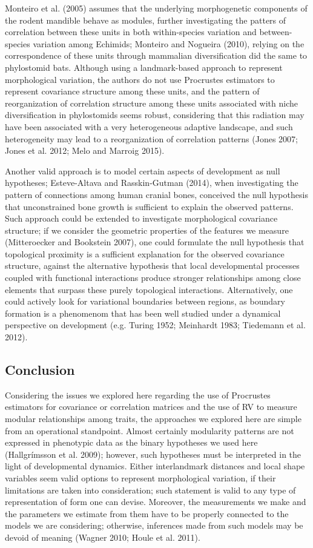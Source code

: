 \documentclass[12pt,]{article}
\begin{document}
Monteiro et al. (2005) assumes that the underlying morphogenetic
components of the rodent mandible behave as modules, further
investigating the patters of correlation between these units in both
within-species variation and between-species variation among Echimids;
Monteiro and Nogueira (2010), relying on the correspondence of these
units through mammalian diversification did the same to phylostomid
bats. Although using a landmark-based approach to represent
morphological variation, the authors do not use Procrustes estimators to
represent covariance structure among these units, and the pattern of
reorganization of correlation structure among these units associated
with niche diversification in phylostomids seems robust, considering
that this radiation may have been associated with a very heterogeneous
adaptive landscape, and such heterogeneity may lead to a reorganization
of correlation patterns (Jones 2007; Jones et al. 2012; Melo and Marroig
2015).

Another valid approach is to model certain aspects of development as
null hypotheses; Esteve-Altava and Rasskin-Gutman (2014), when
investigating the pattern of connections among human cranial bones,
conceived the null hypothesis that unconstrained bone growth is
sufficient to explain the observed patterns. Such approach could be
extended to investigate morphological covariance structure; if we
consider the geometric properties of the features we measure
(Mitteroecker and Bookstein 2007), one could formulate the null
hypothesis that topological proximity is a sufficient explanation for
the observed covariance structure, against the alternative hypothesis
that local developmental processes coupled with functional interactions
produce stronger relationships among close elements that surpass these
purely topological interactions. Alternatively, one could actively look
for variational boundaries between regions, as boundary formation is a
phenomenom that has been well studied under a dynamical perspective on
development (e.g. Turing 1952; Meinhardt 1983; Tiedemann et al. 2012).

\subsection{Conclusion}\label{conclusion}

Considering the issues we explored here regarding the use of Procrustes
estimators for covariance or correlation matrices and the use of RV to
measure modular relationships among traits, the approaches we explored
here are simple from an operational standpoint. Almost certainly
modularity patterns are not expressed in phenotypic data as the binary
hypotheses we used here (Hallgrímsson et al. 2009); however, such
hypotheses must be interpreted in the light of developmental dynamics.
Either interlandmark distances and local shape variables seem valid
options to represent morphological variation, if their limitations are
taken into consideration; such statement is valid to any type of
representation of form one can devise. Moreover, the measurements we
make and the parameters we estimate from them have to be properly
connected to the models we are considering; otherwise, inferences made
from such models may be devoid of meaning (Wagner 2010; Houle et al.
2011).
\end{document}
